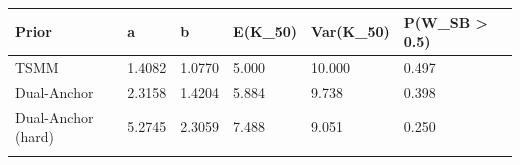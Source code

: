\begin{longtable}{llllll}
\toprule
Prior & a & b & E(K\_50) & Var(K\_50) & P(W\_SB > 0.5) \\
\midrule\endhead
TSMM & 1.4082 & 1.0770 & 5.000 & 10.000 & 0.497 \\ \addlinespace[3pt]
Dual-Anchor & 2.3158 & 1.4204 & 5.884 & 9.738 & 0.398 \\ \addlinespace[3pt]
Dual-Anchor (hard) & 5.2745 & 2.3059 & 7.488 & 9.051 & 0.250 \\ \addlinespace[3pt]
\bottomrule\end{longtable}
